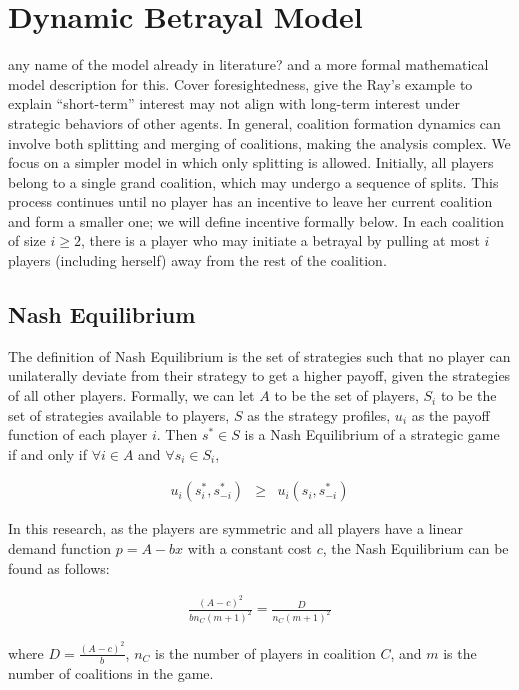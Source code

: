 \documentclass[sigconf,anonymous]{aamas}
\newcommand{\ykc}[1]{{\color{blue} #1}}
\begin{document}
\section{Dynamic Betrayal Model}

\ykc{any name of the model already in literature? and a more formal mathematical model description for this. Cover foresightedness, give the Ray's example to explain ``short-term'' interest may not align with long-term interest under strategic behaviors of other agents.}
In general, coalition formation dynamics can involve both splitting and merging of coalitions, making the analysis complex. We focus on a simpler model in which only splitting is allowed. Initially, all players belong to a single grand coalition, which may undergo a sequence of splits. This process continues until no player has an incentive to leave her current coalition and form a smaller one; we will define incentive formally below. In each coalition of size $i \geq 2$, there is a player who may initiate a betrayal by pulling at most $i$ players (including herself) away from the rest of the coalition.


\subsection{Nash Equilibrium}

The definition of Nash Equilibrium is the set of strategies such that no player can unilaterally deviate from their strategy to get a higher payoff, given the strategies of all other players. Formally, we can let $A$ to be the set of players, $S_i$ to be the set of strategies available to players, $S$ as the strategy profiles, $u_i$ as the payoff function of each player $i$. Then $s^*\in S$ is a Nash Equilibrium of a strategic game if and only if $\forall i \in A$ and $\forall s_i \in S_i$, 

\begin{eqnarray}
u_i(s^*_i, s_{-i}^*) & \geq & u_i(s_i, s_{-i}^*)
\end{eqnarray} 

In this research, as the players are symmetric and all players have a linear demand function $p = A - bx$ with a constant cost $c$, the Nash Equilibrium can be found as follows: 

\begin{eqnarray}
	\frac{(A-c)^2}{bn_C(m+1)^2} = \frac{D}{n_C(m+1)^2}
\end{eqnarray}

where $D = \frac{(A-c)^2}{b}$, $n_C$ is the number of players in coalition $C$, and $m$ is the number of coalitions in the game. 
\end{document}
